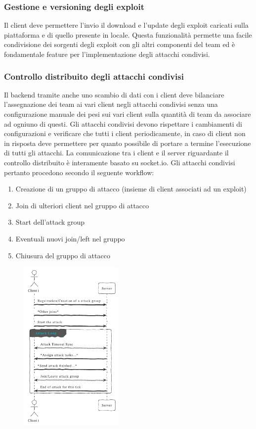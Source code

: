 \documentclass[11pt]{article}
\begin{document}
\subsubsection{Gestione e versioning degli exploit}
Il client deve permettere l'invio il download e l'update degli exploit caricati sulla piattaforma e di quello presente in locale. Questa funzionalità permette una facile condivisione dei sorgenti degli exploit con gli altri componenti del team ed è fondamentale feature per l'implementazione degli attacchi condivisi.
\subsubsection{Controllo distribuito degli attacchi condivisi}
Il backend tramite anche uno scambio di dati con i client deve bilanciare l'assegnazione dei team ai vari client negli attacchi condivisi senza una configurazione manuale dei pesi sui vari client sulla quantità di team da associare ad ogniuno di questi. Gli attacchi condivisi devono rispettare i cambiamenti di configurazioni e verificare che tutti i client periodicamente, in caso di client non in risposta deve permettere per quanto possibile di portare a termine l'esecuzione di tutti gli attacchi.
La comunicazione tra i client e il server riguardante il controllo distribuito è interamente basato su socket.io.
Gli attacchi condivisi pertanto procedono secondo il seguente workflow:
\begin{enumerate}
	\item Creazione di un gruppo di attacco (insieme di client associati ad un exploit)
	\item Join di ulteriori client nel gruppo di attacco
	\item Start dell'attack group
	\item Eventuali nuovi join/left nel gruppo
	\item Chiusura del gruppo di attacco
\end{enumerate}
\begin{figure}[H]
	\centering
	\includegraphics[width=0.45\textwidth]{shared_attack_sequence.png}
\end{figure}
\end{document}
